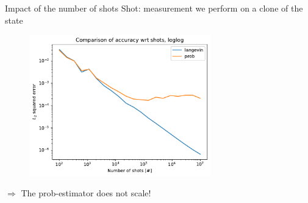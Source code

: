 \documentclass{beamer}
\begin{document}
\begin{frame}{Impact of the number of shots}
    Shot: measurement we perform on a clone of the state
    \begin{figure}[H]

        \centering
        \includegraphics[width=0.7\textwidth]{figures/experiments/shots/shots_acc_comp_shots_exp_loglog-1.png}
    
    
    
    
    
    
    
    
    
    
    
    
        
    
    \end{figure}
    $\Longrightarrow$ The prob-estimator does not scale!
\end{frame}
\end{document}
